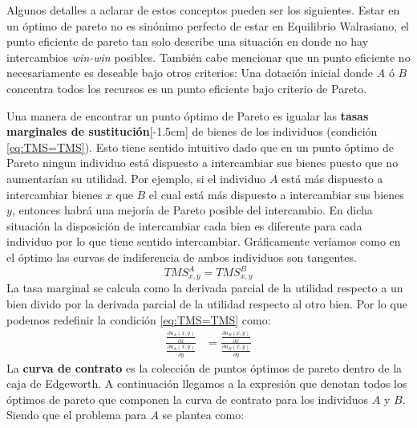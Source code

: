 Algunos detalles a aclarar de estos conceptos pueden ser los siguientes.
Estar en un óptimo de pareto no es sinónimo perfecto de estar en Equilibrio Walrasiano, el punto eficiente de pareto tan solo describe una situación en donde no hay intercambios \textit{win-win} posibles. También cabe mencionar que un punto eficiente no necesariamente es deseable bajo otros criterios: Una dotación inicial donde $A$ ó $B$ concentra todos los recursos es un punto eficiente bajo criterio de Pareto.

Una manera de encontrar un punto óptimo de Pareto es igualar las \textbf{tasas marginales de sustitución}[-1.5cm] de bienes de los individuos (condición \ref{eq:TMS=TMS}). Esto tiene sentido intuitivo dado que en un punto óptimo de Pareto ningun individuo está dispuesto a intercambiar sus bienes puesto que no aumentarían su utilidad. Por ejemplo, si el individuo $A$ está más dispuesto a intercambiar bienes $x$ que $B$ el cual está más dispuesto a intercambiar sus bienes $y$, entonces habrá una mejoría de Pareto posible del intercambio. En dicha situación la disposición de intercambiar cada bien es diferente para cada individuo por lo que tiene sentido intercambiar. Gráficamente veríamos como en el óptimo las curvas de indiferencia de ambos individuos son tangentes.
\begin{equation}
    TMS_{x,y}^A = TMS_{x,y}^B \label{eq:TMS=TMS}
\end{equation}
La tasa marginal se calcula como la derivada parcial de la utilidad respecto a un bien divido por la derivada parcial de la utilidad respecto al otro bien. Por lo que podemos redefinir la condición \ref{eq:TMS=TMS} como: 
\begin{align*}
    \frac{    \frac{\partial u_A(x,y)}{\partial x}       }{      \frac{\partial u_A(x,y)}{\partial y}     } & =  \frac{    \frac{\partial u_B(x,y)}{\partial x}       }{      \frac{\partial u_B(x,y)}{\partial y}     } 
\end{align*}
La \textbf{curva de contrato} es la colección de puntos óptimos de pareto dentro de la caja de Edgeworth. A continuación llegamos a la expresión que denotan todos los óptimos de pareto que componen la curva de contrato para los individuos $A$ y $B$. Siendo que el problema para $A$ se plantea como:
